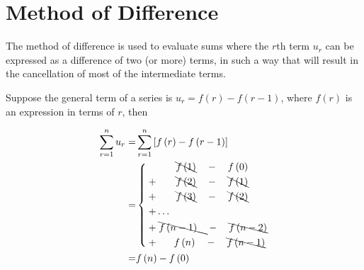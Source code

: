 \documentclass[11pt,a4paper]{book}
\begin{document}
\section{Method of Difference}

The method of difference is used to evaluate sums where the $r\text{th}$
term $u_{r}$ can be expressed as a difference of two (or more) terms,
in such a way that will result in the cancellation of most of the
intermediate terms.

Suppose the general term of a series is $u_{r}=f\left(r\right)-f\left(r-1\right)$,
where $f\left(r\right)$ is an expression in terms of $r$, then

\begin{align*}
\sum_{r=1}^{n}u_{r}= & \sum_{r=1}^{n}\left[f\left(r\right)-f\left(r-1\right)\right]\\
= & \left\{ \:\begin{aligned} & \qquad\bcancel{f\left(1\right)}\quad-\quad f\left(0\right)\\
+ & \qquad\bcancel{f\left(2\right)}\quad-\quad\bcancel{f\left(1\right)}\\
+ & \qquad\bcancel{f\left(3\right)}\quad-\quad\bcancel{f\left(2\right)}\\
+ & \ldots\\
+ & \;\bcancel{f\left(n-1\right)\quad}-\quad\bcancel{f\left(n-2\right)}\\
+ & \hspace{1.8em} f\left(n\right)\quad-\quad\bcancel{f\left(n-1\right)}
\end{aligned}
\right.\\
= & f\left(n\right)-f\left(0\right)
\end{align*}

\newpage
\end{document}
